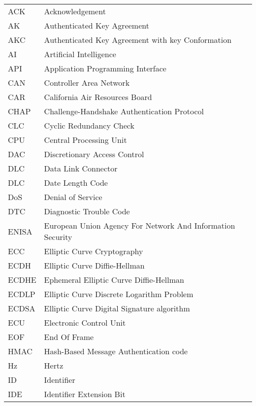 \documentclass[master=cws,masteroption=vs,english]{kulemt}
\begin{document}
	\renewcommand{\arraystretch}{1.1}
	\begin{tabularx}{\textwidth}{@{}p{14mm}X@{}}
	ACK & Acknowledgement \\
	AK & Authenticated Key Agreement \\
	AKC & Authenticated Key Agreement with key Conformation \\
	AI & Artificial Intelligence \\
	API & Application Programming Interface \\
	CAN & Controller Area Network \\
	CAR & California Air Resources Board \\
	CHAP & Challenge-Handshake Authentication Protocol \\
	CLC & Cyclic Redundancy Check \\
	CPU & Central Processing Unit \\
	DAC & Discretionary Access Control \\
	DLC & Data Link Connector \\
	DLC & Date Length Code \\
	DoS & Denial of Service \\
	DTC & Diagnostic Trouble Code \\
	ENISA & European Union Agency For Network And Information Security \\
	ECC & Elliptic Curve Cryptography \\
	ECDH & Elliptic Curve Diffie-Hellman \\
	ECDHE & Ephemeral Elliptic Curve Diffie-Hellman \\
	ECDLP & Elliptic Curve Discrete Logarithm Problem \\
	ECDSA & Elliptic Curve Digital Signature algorithm \\
	ECU & Electronic Control Unit \\
	EOF & End Of Frame \\
	HMAC & Hash-Based Message Authentication code \\
	Hz & Hertz \\
	ID & Identifier \\
	IDE & Identifier Extension Bit \\
	\end{tabularx}
\newpage
\end{document}
